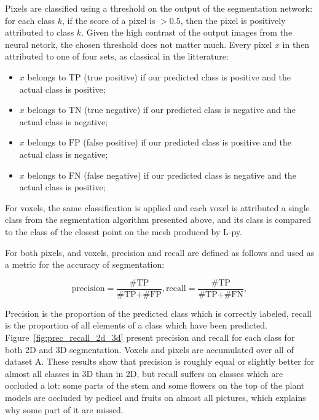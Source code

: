 Pixels are classified using a threshold on the output of the segmentation
network: for each class $k$, if the score of a pixel is $>0.5$, then the pixel is
positively attributed to class $k$. Given the high contrast of the output images
from the neural netork, the chosen threshold does not matter much. Every pixel
$x$ in then attributed to one of four sets, as classical in the litterature:

\begin{itemize}
    \item $x$ belongs to $\textrm{TP}$ (true positive) if our predicted class is positive and the actual class is
positive;
    \item $x$ belongs to $\textrm{TN}$ (true negative) if our predicted class is negative and the actual class is
negative;
    \item $x$ belongs to $\textrm{FP}$ (false positive) if our predicted class is positive and the actual class is
negative;
    \item $x$ belongs to $\textrm{FN}$ (false negative) if our predicted class is negative and the actual class is
positive;
\end{itemize}

For voxels, the same classification is applied and each voxel is attributed a single class
from the segmentation algorithm presented above, and its class is compared to
the class of the closest point on the mesh produced by L-py.

For both pixels, and voxels, precision and recall are defined as follows and
used as a metric for the accuracy of segmentation:

$$
    \textrm{precision} = \frac{\textrm{\# TP} }{\textrm{\# TP} + \textrm{\# FP}},
    \textrm{recall} = \frac{\textrm{\# TP} }{\textrm{\# TP} + \textrm{\# FN}},
$$

Precision is the proportion of the predicted class which is correctly labeled,
recall is the proportion of all elements of a class which have been predicted.
Figure~\ref{fig:prec_recall_2d_3d} present precision and recall for each class
for both 2D and 3D segmentation. Voxels and pixels are accumulated over all of
dataset A. These results show that precision is roughly equal or slightly better
for almost all classes in 3D than in 2D, but recall suffers on classes which are
occluded a lot: some parts of the stem and some flowers on the top of the plant
models are occluded by pedicel and fruits on almost all pictures, which explains
why some part of it are missed.

